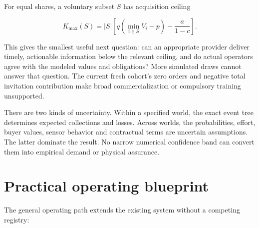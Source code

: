 \documentclass[11pt,letterpaper]{article}
\begin{document}
For equal shares, a voluntary subset \(S\) has acquisition ceiling

\[
K_{\max}(S)=|S|\left[q\left(\min_{i\in S}V_i-p\right)-\frac{a}{1-c}\right].
\]

This gives the smallest useful next question: can an appropriate
provider deliver timely, actionable information below the relevant
ceiling, and do actual operators agree with the modeled values and
obligations? More simulated draws cannot answer that question. The
current fresh cohort's zero orders and negative total invitation
contribution make broad commercialization or compulsory training
unsupported.

There are two kinds of uncertainty. Within a specified world, the exact
event tree determines expected collections and losses. Across worlds,
the probabilities, effort, buyer values, sensor behavior and contractual
terms are uncertain assumptions. The latter dominate the result. No
narrow numerical confidence band can convert them into empirical demand
or physical assurance.

\hypertarget{practical-operating-blueprint}{%
\section{Practical operating
blueprint}\label{practical-operating-blueprint}}

The general operating path extends the existing system without a
competing registry:
\end{document}
